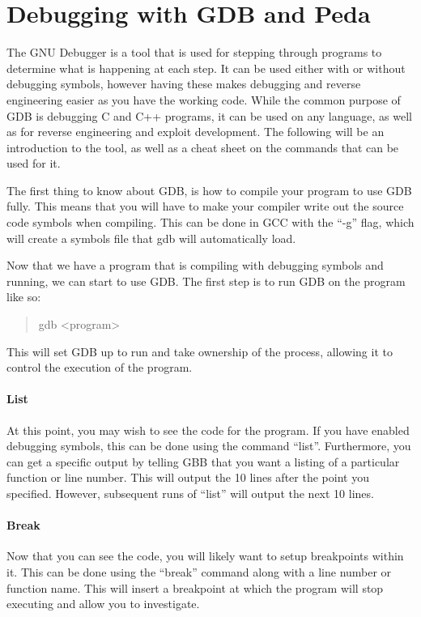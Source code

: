 \documentclass[a4paper,11pt]{report}
\begin{document}
	\section{Debugging with GDB and Peda}
		The GNU Debugger is a tool that is used for stepping through programs to determine what is happening at each step. 
		It can be used either with or without debugging symbols, 
		however having these makes debugging and reverse engineering easier as you have the working code. 
		While the common purpose of GDB is debugging C and C++ programs, it can be used on any language, as well as for reverse engineering and exploit development. 
		The following will be an introduction to the tool, as well as a cheat sheet on the commands that can be used for it. 
			
		The first thing to know about GDB, is how to compile your program to use GDB fully. 
		This means that you will have to make your compiler write out the source code symbols when compiling. 
		This can be done in GCC with the ``-g'' flag, which will create a symbols file that gdb will automatically load. 

		Now that we have a program that is compiling with debugging symbols and running, we can start to use GDB. 
		The first step is to run GDB on the program like so:
		\begin{quote}
			gdb <program>
		\end{quote}
		This will set GDB up to run and take ownership of the process, allowing it to control the execution of the program. 

		\paragraph{List}
		At this point, you may wish to see the code for the program. 
		If you have enabled debugging symbols, this can be done using the command ``list''. 
		Furthermore, you can get a specific output by telling GBB that you want a listing of a particular function or line number. 
		This will output the 10 lines after the point you specified. 
		However, subsequent runs of ``list'' will output the next 10 lines. 

		\paragraph{Break}
		Now that you can see the code, you will likely want to setup breakpoints within it. 
		This can be done using the ``break'' command along with a line number or function name. 
		This will insert a breakpoint at which the program will stop executing and allow you to investigate. 
			
\end{document}
